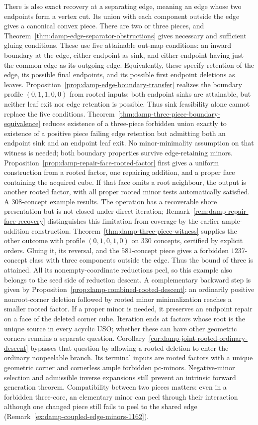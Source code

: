 \documentclass[11pt]{article}
\numberwithin{equation}{section}
\theoremstyle{definition}
\theoremstyle{remark}
\begin{document}
There is also exact recovery at a separating edge, meaning an edge
whose two endpoints form a vertex cut.  Its union with each component
outside the edge gives a canonical convex piece.  There are two or
three pieces, and Theorem~\ref{thm:damp-edge-separator-obstructions}
gives necessary and sufficient gluing conditions.  These use five attainable out-map conditions: an inward boundary at the
edge, either endpoint as sink, and either endpoint having just the common
edge as its outgoing edge. Equivalently, these specify retention of the
edge, its possible final endpoints, and its possible first endpoint
deletions as leaves.  Proposition~\ref{prop:damp-edge-boundary-transfer} realizes the boundary
profile $(0,1,1,0,0)$ from rooted inputs: both endpoint sinks are attainable,
but neither leaf exit nor edge retention is possible. Thus sink feasibility
alone cannot replace the five conditions. Theorem~\ref{thm:damp-three-piece-boundary-equivalence}
reduces existence of a three-piece forbidden union exactly to existence
of a positive piece failing edge retention but admitting both an endpoint
sink and an endpoint leaf exit. No minor-minimality assumption on that
witness is needed; both boundary properties survive edge-retaining minors.
Proposition~\ref{prop:damp-repair-face-rooted-factor} first gives a uniform
construction from a rooted factor, one repairing addition, and a proper
face containing the acquired cube. If that face omits a root neighbour,
the output is another rooted factor, with all proper rooted minor tests
automatically satisfied. A $308$-concept example results. The operation
has a recoverable shore presentation but is not closed under direct iteration;
Remark~\ref{rem:damp-repair-face-recovery} distinguishes this limitation
from coverage by the earlier ample-addition construction.
Theorem~\ref{thm:damp-three-piece-witness} supplies the other outcome with
profile $(0,1,0,1,0)$ on $330$ concepts, certified by explicit orders.
Gluing it, its reversal, and the $581$-concept piece gives a forbidden
$1237$-concept class with three components outside the edge. Thus the bound
of three is attained. All its nonempty-coordinate reductions peel, so this
example also belongs to the seed side of reduction descent.
A complementary backward step is given by
Proposition~\ref{prop:damp-combined-rooted-descent}: an ordinarily positive
nonroot-corner deletion followed by rooted minor minimalization reaches a
smaller rooted factor. If a proper minor is needed, it preserves an endpoint
repair on a face of the deleted corner cube. Iteration ends at factors whose
root is the unique source in every acyclic USO; whether these can have other
geometric corners remains a separate question. Corollary~\ref{cor:damp-joint-rooted-ordinary-descent}
bypasses that question by allowing a rooted deletion to enter the ordinary
nonpeelable branch. Its terminal inputs are rooted factors with a unique
geometric corner and cornerless ample forbidden pc-minors. Negative-minor
selection and admissible inverse expansions still prevent an intrinsic
forward generation theorem.
Compatibility between two pieces matters:
even in a forbidden three-core, an elementary minor can peel through
their interaction although one changed piece still fails to peel to
the shared edge (Remark~\ref{ex:damp-coupled-edge-minors-1162}).
\end{document}
